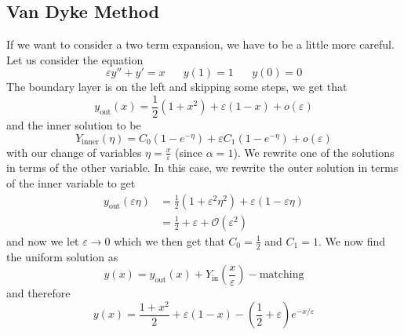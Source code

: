 \documentclass{article}
\newcommand{\twen}{\hspace{20pt}}
\begin{document}
\subsection{Van Dyke Method}
If we want to consider a two term expansion, we have to be a little more careful. Let us consider the equation 
\begin{equation*}
    \varepsilon y'' + y' = x \twen y(1) =1 \twen y(0)=0
\end{equation*}
The boundary layer is on the left and skipping some steps, we get that 
\begin{equation*}
    y_{\text{out}} (x) = \frac{1}{2}(1+x^2)+\varepsilon(1-x)+o (\varepsilon)
\end{equation*}
and the inner solution to be 
\begin{equation*}
    Y_{\text{inner}}(\eta) = C_0(1-e^{-\eta})+\varepsilon C_1 (1-e^{-\eta}) +o(\varepsilon)
\end{equation*}
with our change of variables $\eta = \frac{x}{\varepsilon}$ (since $\alpha = 1$). We rewrite one of the solutions in terms of the other variable. In this case, we rewrite the outer solution in terms of the inner variable to get 
\begin{equation*}
    \begin{split}
        y_{\text{out}} (\varepsilon\eta) &= \frac{1}{2}(1+\varepsilon^2 \eta^2)+\varepsilon(1-\varepsilon \eta) \\
        &=\frac{1}{2} +\varepsilon +\mathcal {O}(\varepsilon^2)
    \end{split}
\end{equation*}
and now we let $\varepsilon \rightarrow 0$ which we then get that $C_0 = \frac{1}{2}$ and $C_1 = 1$. We now find the uniform solution as 
\begin{equation*}
    y(x) = y_{\text{out}}(x) + Y_{\text{in}} \left(\frac{x}{\varepsilon}\right) -\text{matching}
\end{equation*}
and therefore 
\begin{equation*}
    y(x) = \frac{1+x^2}{2} + \varepsilon(1-x)-\left( \frac{1}{2}+\varepsilon\right) e^{-x/\varepsilon}
\end{equation*}
\end{document}
